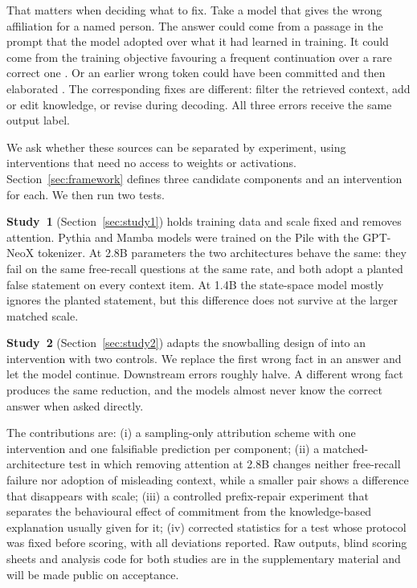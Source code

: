 \documentclass[10pt]{article}
\begin{document}
That matters when deciding what to fix. Take a model that gives the wrong affiliation for a named person. The answer could come from a passage in the prompt that the model adopted over what it had learned in training. It could come from the training objective favouring a frequent continuation over a rare correct one \citep{kandpal2023,mallen2023}. Or an earlier wrong token could have been committed and then elaborated \citep{zhang2024snowball}. The corresponding fixes are different: filter the retrieved context, add or edit knowledge, or revise during decoding. All three errors receive the same output label.

We ask whether these sources can be separated by experiment, using interventions that need no access to weights or activations. Section~\ref{sec:framework} defines three candidate components and an intervention for each. We then run two tests.

\textbf{Study~1} (Section~\ref{sec:study1}) holds training data and scale fixed and removes attention. Pythia \citep{biderman2023pythia} and Mamba \citep{gu2023mamba} models were trained on the Pile with the GPT-NeoX tokenizer. At 2.8B parameters the two architectures behave the same: they fail on the same free-recall questions at the same rate, and both adopt a planted false statement on every context item. At 1.4B the state-space model mostly ignores the planted statement, but this difference does not survive at the larger matched scale.

\textbf{Study~2} (Section~\ref{sec:study2}) adapts the snowballing design of \citet{zhang2024snowball} into an intervention with two controls. We replace the first wrong fact in an answer and let the model continue. Downstream errors roughly halve. A different wrong fact produces the same reduction, and the models almost never know the correct answer when asked directly.

The contributions are:
(i) a sampling-only attribution scheme with one intervention and one falsifiable prediction per component;
(ii) a matched-architecture test in which removing attention at 2.8B changes neither free-recall failure nor adoption of misleading context, while a smaller pair shows a difference that disappears with scale;
(iii) a controlled prefix-repair experiment that separates the behavioural effect of commitment from the knowledge-based explanation usually given for it;
(iv) corrected statistics for a test whose protocol was fixed before scoring, with all deviations reported.
Raw outputs, blind scoring sheets and analysis code for both studies are in the supplementary material and will be made public on acceptance.
\end{document}
